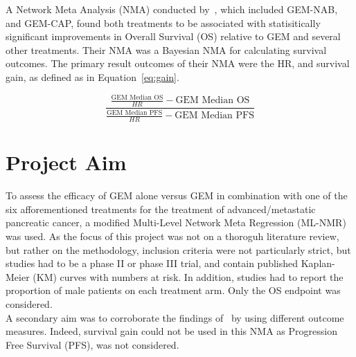 A Network Meta Analysis (NMA) conducted by~\cite{gresham2014}, which included GEM-NAB, and GEM-CAP, found both treatments to be associated with statisitically significant improvements in Overall Survival (OS) relative to GEM and several other treatments. Their NMA was a Bayesian NMA for calculating survival outcomes. The primary result outcomes of their NMA were the HR, and survival gain, as defined as in Equation~\ref{eq:gain}. 

\begin{equation}
    \frac{\frac{\text{GEM Median OS}}{HR}-\text{GEM Median OS}}{\frac{\text{GEM Median PFS}}{HR}-\text{GEM Median PFS}}
    \label{eq:gain}
\end{equation}

\section{Project Aim}
To assess the efficacy of GEM alone versus GEM in combination with one of the six afforementioned treatments for the treatment of advanced/metastatic pancreatic cancer, a modified Multi-Level Network Meta Regression (ML-NMR) was used. As the focus of this project was not on a thoroguh literature review, but rather on the methodology, inclusion criteria were not particularly strict, but studies had to be a phase II or phase III trial, and contain published Kaplan-Meier (KM) curves with numbers at risk. In addition, studies had to report the proportion of male patients on each treatment arm. Only the OS endpoint was considered. \\

A secondary aim was to corroborate the findings of~\cite{gresham2014} by using different outcome measures. Indeed, survival gain could not be used in this NMA as Progression Free Survival (PFS), was not considered.

